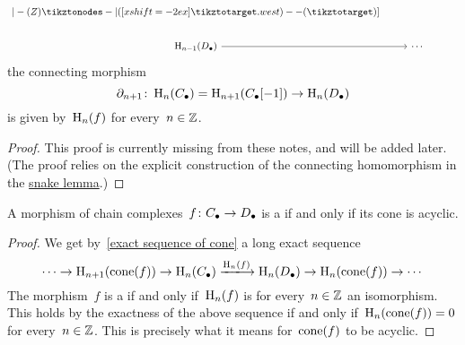 \begin{proposition}
\begin{enumerate}
\[\begin{tikzcd}
{                              |- (Z) \tikztonodes
                              -| ([xshift=-2ex]\tikztotarget.west)
                              -- (\tikztotarget)}
                  ]
          \\
            \Hl_{n-1}(\Dcc)
            \arrow{r}
          & \dotsb
          & {}
        \end{tikzcd}
      \]
      the connecting morphism
      \[
        \partial_{n+1}
        \colon
        \operatorname{H}_n(C_\bullet)
        =
        \operatorname{H}_{n+1}(C_\bullet[-1])
        \to
        \operatorname{H}_n(D_\bullet)
      \]
      is given by~$\operatorname{H}_n(f)$ for every~$n \in \mathbb{Z}$.
  \end{enumerate}
\end{proposition}


\begin{proof}
  This proof is currently missing from these notes, and will be added later.
  (The proof relies on the explicit construction of the connecting homomorphism in the \hyperref[snake lemma]{snake lemma}.)
\end{proof}


\begin{corollary}
  A morphism of chain complexes~$f \colon C_\bullet \to D_\bullet$ is a {\qim} if and only if its cone is acyclic.
\end{corollary}


\begin{proof}
  We get by~\cref{exact sequence of cone} a long exact sequence
  \[
    \dotsb
    \to
    \Hl_{n+1}(\cone(f))
    \to
    \Hl_n(\Ccc)
    \xlongto{\Hl_n(f)}
    \Hl_n(\Dcc)
    \to
    \Hl_n(\cone(f))
    \to
    \dotsb
  \]
  The morphism~$f$ is a {\qim} if and only if~$\operatorname{H}_n(f)$ is for every~$n \in \mathbb{Z}$ an isomorphism.
  This holds by the exactness of the above sequence if and only if~$\operatorname{H}_n(\operatorname{cone}(f)) = 0$ for every~$n \in \mathbb{Z}$.
  This is precisely what it means for~$\operatorname{cone}(f)$ to be acyclic.
\end{proof}









